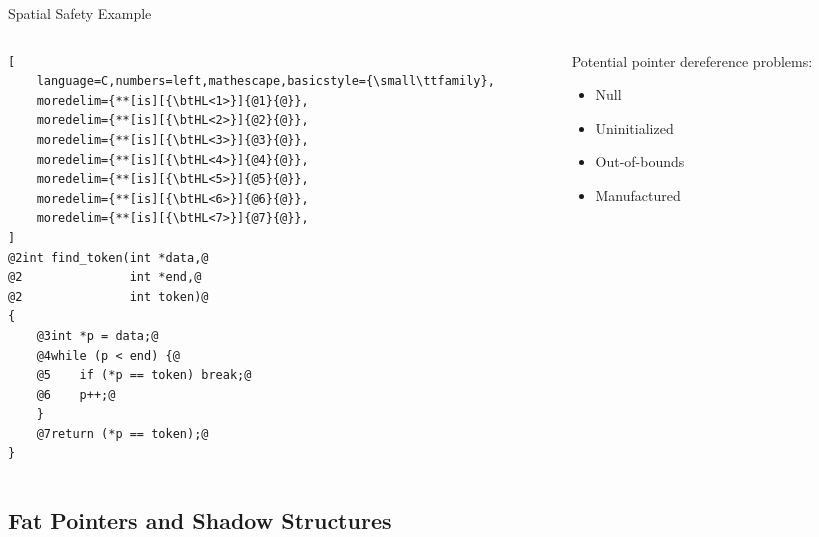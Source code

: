 \documentclass[aspectratio=169]{beamer}
\begin{document}
\begin{frame}[fragile]{Spatial Safety Example}
\begin{columns}[T]
\begin{column}{0.52\textwidth}
\begin{lstlisting}[
    language=C,numbers=left,mathescape,basicstyle={\small\ttfamily},
    moredelim={**[is][{\btHL<1>}]{@1}{@}},
    moredelim={**[is][{\btHL<2>}]{@2}{@}},
    moredelim={**[is][{\btHL<3>}]{@3}{@}},
    moredelim={**[is][{\btHL<4>}]{@4}{@}},
    moredelim={**[is][{\btHL<5>}]{@5}{@}},
    moredelim={**[is][{\btHL<6>}]{@6}{@}},
    moredelim={**[is][{\btHL<7>}]{@7}{@}},
]
@2int find_token(int *data,@
@2               int *end,@
@2               int token)@
{
    @3int *p = data;@
    @4while (p < end) {@
    @5    if (*p == token) break;@
    @6    p++;@
    }
    @7return (*p == token);@
}
\end{lstlisting}
\end{column} 
\begin{column}{0.44\textwidth}

\footnotesize{
Potential pointer dereference problems:
  \begin{itemize}[<+->]
      \item Null
      \item Uninitialized
      \item Out-of-bounds 
      \item Manufactured 
  \end{itemize}
}
\end{column}
\end{columns}

\end{frame}

\subsection{Fat Pointers and Shadow Structures}
\end{document}
